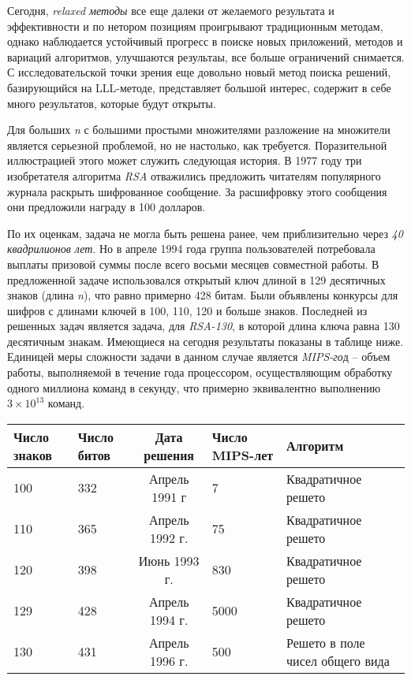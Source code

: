   Сегодня, \textit{relaxed методы} все еще далеки от желаемого результата и эффективности и по нетором позициям проигрывают традиционным методам,
  однако наблюдается устойчивый прогресс в поиске новых приложений, методов и вариаций алгоритмов, улучшаются результаы, все больше ограничений
  снимается. С исследовательской точки зрения еще довольно новый метод поиска решений, базирующийся на LLL-методе, представляет большой интерес,
  содержит в себе много результатов, которые будут открыты.
  
  Для больших \textit{n} с большими простыми множителями разложение на множители является серьезной проблемой, но не настолько, как требуется. 
  Поразительной иллюстрацией этого может служить следующая история. В 1977 году три изобретателя алгоритма
\textit{RSA} отважились предложить читателям 
  популярного журнала раскрыть шифрованное сообщение. За расшифровку этого сообщения они предложили
награду в 100 долларов.
  
  По их оценкам, задача не могла быть решена ранее, чем приблизительно через \textit{40 квадрилионов лет}. Но в апреле 1994 года группа пользователей 
  потребовала выплаты
призовой суммы после всего восьми месяцев совместной работы. В предложенной задаче использовался открытый ключ длиной в
  129 десятичных знаков (длина \textit{n}), что
равно примерно 428 битам. Были объявлены конкурсы для шифров с длинами ключей в 100, 110, 120
  и больше знаков. Последней из
решенных задач является задача, для \textit{RSA-130}, в которой длина ключа 
  равна 130 десятичным знакам. Имеющиеся на сегодня результаты показаны в таблице ниже. Единицей меры
сложности задачи в данном случае является \textit{MIPS-го}д – 
  объем работы, выполняемой в
течение года процессором, осуществляющим обработку одного миллиона команд в секунду, что примерно эквивалентно 
  выполнению {$3\times10^{13}$} команд.
  
  \begin{table}[ht]
    \begin{tabular}{@{}p{2.5cm}p{2.5cm}cp{2.5cm}p{4.5cm}@{}}
    \toprule
    \textbf{Число знаков} & \textbf{Число битов} & \textbf{Дата решения} & \textbf{Число MIPS-лет} & \textbf{Алгоритм} \\ \midrule
    100                              & 332                  & Апрель 1991 г         & 7                       & Квадратичное решето              \\
    110                              & 365                  & Апрель 1992 г.        & 75                      & Квадратичное решето              \\
    120                              & 398                  & Июнь 1993 г.          & 830                     & Квадратичное решето              \\
    129                              & 428                  & Апрель 1994 г.        & 5000                    & Квадратичное решето              \\
    130                              & 431                  & Апрель 1996 г.        & 500                     & Решето в поле чисел общего вида  \\ \bottomrule
    \end{tabular}
  \end{table}
  
